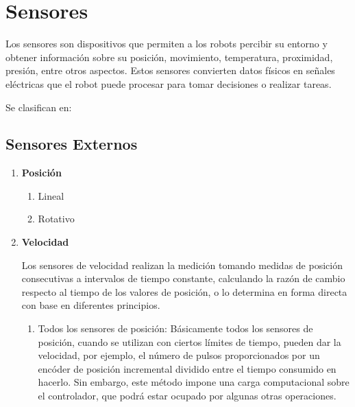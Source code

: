  \section{Sensores}
	Los sensores son dispositivos que permiten a los robots percibir su entorno y obtener información sobre su posición, movimiento, temperatura, proximidad, presión, entre otros aspectos. Estos sensores convierten datos físicos en señales eléctricas que el robot puede procesar para tomar decisiones o realizar tareas.

Se clasifican en:

	\subsection{Sensores Externos}
		\begin{enumerate}
			\item \textbf{Posición}
			\begin{enumerate}
				\item Lineal
				\item Rotativo
			\end{enumerate}
			
			\item \textbf{Velocidad}
			
            Los sensores de velocidad realizan la medición tomando medidas de posición consecutivas a intervalos de tiempo constante, calculando la razón de cambio respecto al tiempo de los valores de posición, o lo determina en forma directa con base en diferentes principios.\cite{saha2010robotics}\\
           
			
			\begin{enumerate}
				\item Todos los sensores de posición:
				Básicamente todos los sensores de posición, cuando se utilizan con ciertos límites de tiempo, pueden dar la velocidad, por ejemplo, el número de pulsos proporcionados por un encóder de posición incremental dividido entre el tiempo consumido en hacerlo. Sin embargo, este método impone una carga computacional sobre el controlador, que podrá estar ocupado por algunas otras operaciones.\\
		
		\begin{figure}[h]
			\centering
			\hfill
		\end{figure}
		

\end{enumerate}
\end{enumerate}
